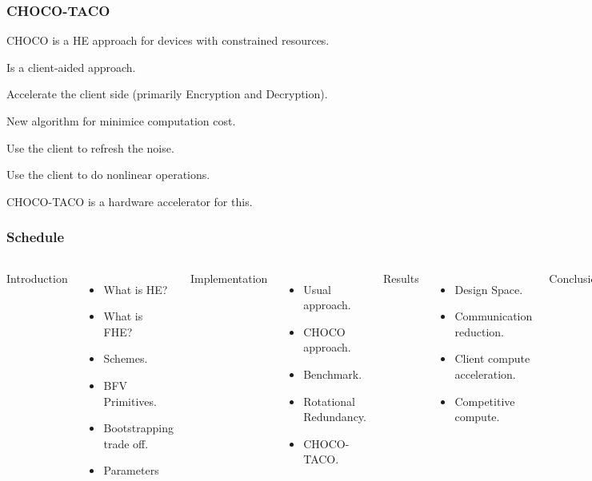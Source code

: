 \documentclass[10pt]{beamer}
\begin{document}
\begin{frame}
    \frametitle{CHOCO-TACO}

    CHOCO is a HE approach for devices with constrained resources.

    Is a client-aided approach.

    Accelerate the client side (primarily Encryption and Decryption).

    New algorithm for minimice computation cost.

    Use the client to refresh the noise.

    Use the client to do nonlinear operations.

    CHOCO-TACO is a hardware accelerator for this.
\end{frame}
\begin{frame}[noframenumbering]
    \frametitle{Schedule}
\begin{columns}
    Introduction
    \begin{itemize}
        \item What is HE?
        \item What is FHE?
        \item Schemes.
        \item BFV Primitives.
        \item Bootstrapping trade off.
        \item Parameters
    \end{itemize}

    Implementation
    \begin{itemize}
        \item Usual approach.
        \item CHOCO approach.
        \item Benchmark.
        \item Rotational Redundancy.
        \item CHOCO-TACO.
    \end{itemize}

    Results
    \begin{itemize}
        \item Design Space.
        \item Communication reduction.
        \item Client compute acceleration.
        \item Competitive compute.
    \end{itemize}
    Conclusion
\end{columns}

\end{frame}
\end{document}
